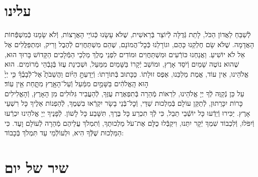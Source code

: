 \documentclass[twoside, openany, parskip=half, 11pt]{book}
\begin{document}
\uvaletzion

\\
\\


\label{end of shacharis}
\fullkaddish

\section*{ עלינו }

\newcommand{\aleinu}{
\firstword{עָלֵֽינוּ}
לְֿשַׁבֵּחַ לַאֲדוֹן הַכֹּל, לָתֵת גְּֿדֻלָּה לְֿיוֹצֵר בְּֿרֵאשִׁית, שֶׁלֹּא עָשָׂנוּ כְּֿגוֹיֵי הָאֲרָצוֹת, וְֿלֹא שָׂמָנוּ כְּֿמִשְׁפְּֿֿֿחוֹת הָאֲדָמָה. שֶׁלֹּא שָׂם חֶלְקֵנוּ כָּהֶם, וגוֹרָלֵנוּ כְּֿכׇל־הֲמוֹנָם, שֶׁהֵם מִשְׁתַּחֲוִים לְֿהֶבֶל וָרִיק, וּמִתְפַּלֲּלִים אֶל אֵל לֹא יוֹשִׁיעַ. וַאֲנַחְנוּ כּוֹרְֿעִים וּמִשְׁתַּחֲוִים וּמוֹדִים לִפְנֵי מֶלֶךְ מַלְכֵי הַמְּֿֿלָכִים הַקָּדוֹשׁ בָּרוּךְ הוּא, שֶׁהוּא נוֹטֶה שָׁמַיִם וְֿיֹסֵד אָרֶץ, וּמוֹשַׁב יְֿקָרוֹ בַּשָּׁמַיִם מִמַּעַל, וּשְׁכִינַת עֻזּוֹ בְּֿגָבְֿהֵי מְֿרוֹמִים. הוּא אֱלֹהֵינוּ, אֵין עוֹד, אֱמֶת מַלְכֵּנוּ, אֶפֶס זוּלָתוֹ. כַּכָּתוּב בְּֿתּוֹרָתוֹ: וְֿיָדַעְתָּ֣
\source{דברים ד}
הַיּ֗וֹם וַהֲשֵׁבֹתָ֮ אֶל־לְֿבָבֶ֒ךָ֒ כִּ֤י יְיָ֙ ה֣וּא הָֽאֱלֹהִ֔ים בַּשָּׁמַ֣יִם מִמַּ֔עַל וְֿעַל־הָאָ֖רֶץ מִתָּ֑חַת אֵ֖ין עֽוֹד׃\\
עַל כֵּן נְֿקַוֶּה לְֿךָ יְיָ אֱלֹהֵינוּ, לִרְאוֹת מְֿהֵרָה בְּֿתִפְאֶרֶת עֻזֶּךָ, לְֿהַעֲבִיר גִּלּוּלִים מִן הָאָרֶץ, וְֿהָאֱלִילִים כָּרוֹת יִכָּרֵתוּן, לְֿתַקֵּן עוֹלָם בְּֿמַלְכוּת שַׁדַּי, וְֿכׇל־בְּֿנֵי בָשָׂר יִקְרְֿאוּ בִשְׁמֶךָ, לְֿהַפְנוֹת אֵלֶיךָ כָּל רִשְׁעֵי אָרֶץ. יַכִּירוּ וְֿיֵדְֿעוּ כָּל יוֹשְֿֿׁבֵי תֵבֵל, כִּי לְֿךָ תִכְרַע כָּל בֶּרֶךְ, תִּשָּׁבַע כָּל לָשׁוֹן. לְֿפָנֶיךָ יְיָ אֱלֹהֵינוּ יִכְרְֿעוּ וְֿיִפֹּלוּ, וְֿלִכְבוֹד שִׁמְךָ יְֿקָר יִתֵּנוּ, \adforn{14} וִיקַבְּֿֿלוּ כֻלָּם אֶת־עֹל מַלְכוּתֶךָ, וְֿתִמְלֹךְ עֲלֵיהֶם מְֿהֵרָה לְֿעוֹלָם וָעֶד. כִּי הַמַּלְכוּת שֶׁלְּֿֿךָ הִיא, וּלְעוֹלְֿמֵי עַד תִּמְלֹךְ בְּֿכָבוֹד:
}

\aleinu


\section[שיר של יום]{ שיר של יום }
\label{shir_shel_yom}

\\
\vspace{-1.5\baselineskip}
\kafdalet
\end{document}
